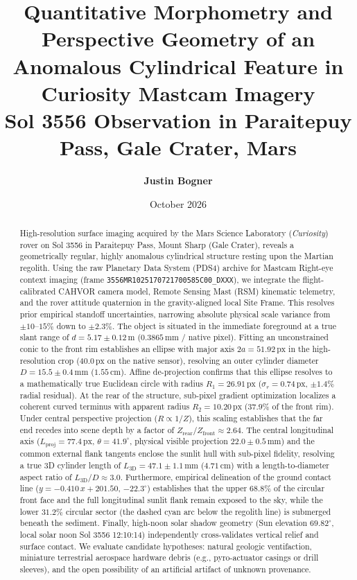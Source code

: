 \documentclass[11pt,a4paper]{article}
\title{\vspace{-1.5cm}\textbf{\Large Quantitative Morphometry and Perspective Geometry of an Anomalous Cylindrical Feature in Curiosity Mastcam Imagery}\\[0.25cm]\large\textsf{Sol 3556 Observation in Paraitepuy Pass, Gale Crater, Mars}}
\author{\textbf{Justin Bogner}}
\date{October 2026}
\newcommand{\pdsframe}{\texttt{3556MR}\allowbreak\texttt{102517}\allowbreak\texttt{0721700585C00\_DXXX}}
\begin{document}
\maketitle

\begin{abstract}
\noindent High-resolution surface imaging acquired by the Mars Science Laboratory (\textit{Curiosity}) rover on Sol 3556 in Paraitepuy Pass, Mount Sharp (Gale Crater), reveals a geometrically regular, highly anomalous cylindrical structure resting upon the Martian regolith. Using the raw Planetary Data System (PDS4) archive for Mastcam Right-eye context imaging (frame \pdsframe), we integrate the flight-calibrated CAHVOR camera model, Remote Sensing Mast (RSM) kinematic telemetry, and the rover attitude quaternion in the gravity-aligned local Site Frame. This resolves prior empirical standoff uncertainties, narrowing absolute physical scale variance from $\pm 10\text{--}15\%$ down to $\pm 2.3\%$. The object is situated in the immediate foreground at a true slant range of $d = 5.17 \pm 0.12\,\text{m}$ ($0.3865\,\text{mm / native pixel}$). Fitting an unconstrained conic to the front rim establishes an ellipse with major axis $2a = 51.92\,\text{px}$ in the high-resolution crop ($40.0\,\text{px}$ on the native sensor), resolving an outer cylinder diameter $D = 15.5 \pm 0.4\,\text{mm}$ ($1.55\,\text{cm}$). Affine de-projection confirms that this ellipse resolves to a mathematically true Euclidean circle with radius $R_1 = 26.91\,\text{px}$ ($\sigma_r = 0.74\,\text{px}$, $\pm 1.4\%$ radial residual). At the rear of the structure, sub-pixel gradient optimization localizes a coherent curved terminus with apparent radius $R_2 = 10.20\,\text{px}$ ($37.9\%$ of the front rim). Under central perspective projection ($R \propto 1/Z$), this scaling establishes that the far end recedes into scene depth by a factor of $Z_{\text{rear}} / Z_{\text{front}} \approx 2.64$. The central longitudinal axis ($L_{\text{proj}} = 77.4\,\text{px}$, $\theta = 41.9^\circ$, physical visible projection $22.0 \pm 0.5\,\text{mm}$) and the common external flank tangents enclose the sunlit hull with sub-pixel fidelity, resolving a true 3D cylinder length of $L_{\text{3D}} = 47.1 \pm 1.1\,\text{mm}$ ($4.71\,\text{cm}$) with a length-to-diameter aspect ratio of $L_{\text{3D}} / D \approx 3.0$. Furthermore, empirical delineation of the ground contact line ($y = -0.410\,x + 201.50$, $-22.3^\circ$) establishes that the upper $68.8\%$ of the circular front face and the full longitudinal sunlit flank remain exposed to the sky, while the lower $31.2\%$ circular sector (the dashed cyan arc below the regolith line) is submerged beneath the sediment. Finally, high-noon solar shadow geometry (Sun elevation $69.82^\circ$, local solar noon Sol 3556 12:10:14) independently cross-validates vertical relief and surface contact. We evaluate candidate hypotheses: natural geologic ventifaction, miniature terrestrial aerospace hardware debris (e.g., pyro-actuator casings or drill sleeves), and the open possibility of an artificial artifact of unknown provenance.
\end{abstract}
\end{document}
